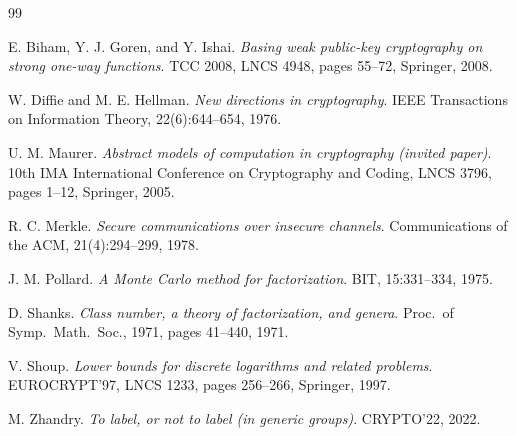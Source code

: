 \documentclass{aicr-conjecture}
\begin{document}
\begin{aicrbibliography}{99}

E. Biham, Y. J. Goren, and Y. Ishai.
\emph{Basing weak public-key cryptography on strong one-way functions}.
TCC 2008, LNCS 4948, pages 55--72, Springer, 2008.

W. Diffie and M. E. Hellman.
\emph{New directions in cryptography}.
IEEE Transactions on Information Theory, 22(6):644--654, 1976.

U. M. Maurer.
\emph{Abstract models of computation in cryptography (invited paper)}.
10th IMA International Conference on Cryptography and Coding, LNCS 3796,
pages 1--12, Springer, 2005.

R. C. Merkle.
\emph{Secure communications over insecure channels}.
Communications of the ACM, 21(4):294--299, 1978.

J. M. Pollard.
\emph{A Monte Carlo method for factorization}.
BIT, 15:331--334, 1975.

D. Shanks.
\emph{Class number, a theory of factorization, and genera}.
Proc.\ of Symp.\ Math.\ Soc., 1971, pages 41--440, 1971.

V. Shoup.
\emph{Lower bounds for discrete logarithms and related problems}.
EUROCRYPT'97, LNCS 1233, pages 256--266, Springer, 1997.

M. Zhandry.
\emph{To label, or not to label (in generic groups)}.
CRYPTO'22, 2022.

\end{aicrbibliography}
\end{document}
